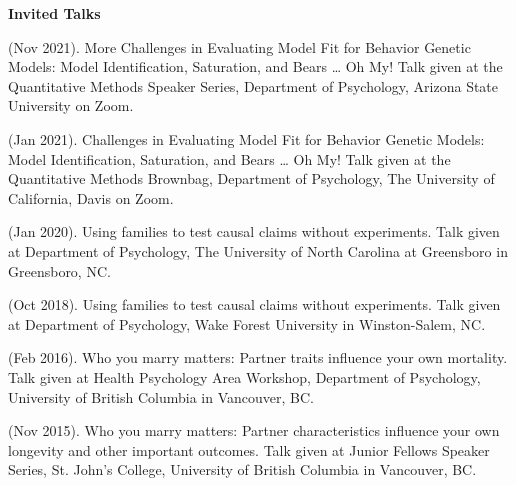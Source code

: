 {\large {\bf Invited Talks}}\begin{etaremune}
\item\meb (Nov 2021). More Challenges in Evaluating Model Fit for Behavior Genetic Models: Model Identification, Saturation, and Bears … Oh My! Talk given at the Quantitative Methods Speaker Series, Department of Psychology, Arizona State University on Zoom.
%
\item\meb (Jan 2021). Challenges in Evaluating Model Fit for Behavior Genetic Models: Model Identification, Saturation, and Bears … Oh My! Talk given at the Quantitative Methods Brownbag, Department of Psychology, The University of California, Davis on Zoom.
%
\item\meb (Jan 2020). Using families to test causal claims without experiments. Talk given at Department of Psychology, The University of North Carolina at Greensboro in Greensboro, NC.
%
%
%
\item\meb (Oct 2018). Using families to test causal claims without experiments. Talk given at Department of Psychology, Wake Forest University in Winston-Salem, NC.
%
\item \meb (Feb 2016). Who you marry matters: Partner traits influence your own mortality. Talk given at Health Psychology Area Workshop, Department of Psychology, University of British Columbia in Vancouver, BC. 
%
\item \meb (Nov 2015). Who you marry matters: Partner characteristics influence your own longevity and other important outcomes. Talk given at Junior Fellows Speaker Series, St. John's College, University of British Columbia in Vancouver, BC. \smallskip
\end{etaremune}
